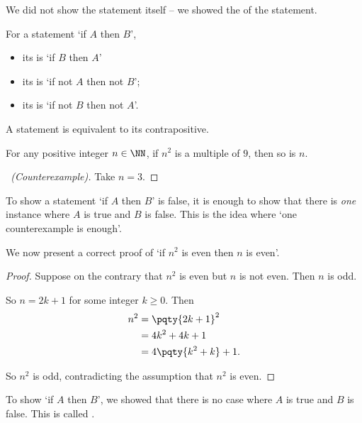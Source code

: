 We did not show the statement itself -- we showed the  of the statement.

\begin{definition}
    For a statement `if \(A\) then \(B\)',
    \begin{itemize}
        \item its  is `if \(B\) then \(A\)'
        \item its  is `if not \(A\) then not \(B\)';
        \item its  is `if not \(B\) then not \(A\)'.
    \end{itemize}
\end{definition}

A statement is equivalent to its contrapositive.

\begin{claim}
    For any positive integer \(n \in \NN\), if \(n^2\) is a multiple of \(9\), then so is \(n\).
\end{claim}

\begin{proof}[\proofname\ (Counterexample)]
    Take \(n = 3\).
\end{proof}

To show a statement `if \(A\) then \(B\)' is false, it is enough to show that there is \emph{one} instance where \(A\) is true and \(B\) is false. This is the idea where `one counterexample is enough'.

We now present a correct proof of `if \(n^2\) is even then \(n\) is even'.

\begin{proof}
    Suppose on the contrary that \(n^2\) is even but \(n\) is not even. Then \(n\) is odd.

    So \(n = 2k + 1\) for some integer \(k \geq 0\). Then
    \begin{align*}
        n^2 &= \pqty{2k + 1}^2 \\
        &= 4k^2 + 4k + 1 \\
        &= 4 \pqty{k^2 + k} + 1.
    \end{align*}

    So \(n^2\) is odd, contradicting the assumption that \(n^2\) is even.
\end{proof}

To show `if \(A\) then \(B\)', we showed that there is no case where \(A\) is true and \(B\) is false. This is called .

